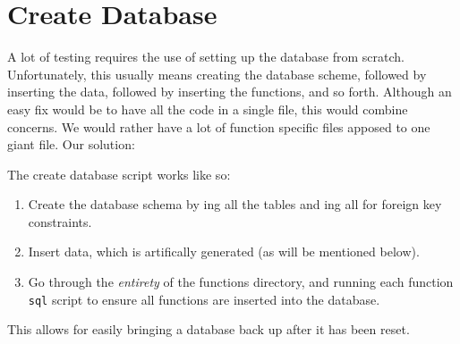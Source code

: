 \section{Create Database}
A lot of testing requires the use of setting up the database from scratch. Unfortunately, this usually means creating the database scheme, followed by inserting the data, followed by inserting the functions, and so forth. Although an easy fix would be to have all the code in a single file, this would combine concerns. We would rather have a lot of function specific files apposed to one giant file. Our solution: 

The create database script works like so:

\begin{enumerate}
    \item Create the database schema by ing all the tables and ing all for foreign key constraints.
    \item Insert data, which is artifically generated (as will be mentioned below).
    \item Go through the \textit{entirety} of the functions directory, and running each function \texttt{sql} script to ensure all functions are inserted into the database.
\end{enumerate}

This allows for easily bringing a database back up after it has been reset.